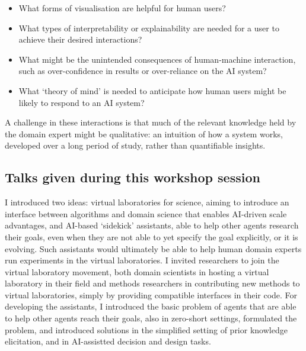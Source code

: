 \begin{itemize}
\item
  What forms of visualisation are helpful for human users?
\item
  What types of interpretability or explainability are needed for a user
  to achieve their desired interactions?
\item
  What might be the unintended consequences of human-machine
  interaction, such as over-confidence in results or over-reliance on
  the AI system?
\item
  What `theory of mind' is needed to anticipate how human users might be
  likely to respond to an AI system?
\end{itemize}

A challenge in these interactions is that much of the relevant knowledge
held by the domain expert might be qualitative: an intuition of how a
system works, developed over a long period of study, rather than
quantifiable insights.

\subsection{Talks given during this workshop session}

\license

I introduced two ideas: virtual laboratories for science, aiming to introduce an interface between algorithms and domain science that enables AI-driven scale advantages, and AI-based ‘sidekick’ assistants, able to help other agents research their goals, even when they are not able to yet specify the goal explicitly, or it is evolving. Such assistants would ultimately be able to help human domain experts run experiments in the virtual laboratories. I invited researchers to join the virtual laboratory movement, both domain scientists in hosting a virtual laboratory in their field and methods researchers in contributing new methods to virtual laboratories, simply by providing compatible interfaces in their code. For developing the assistants, I introduced the basic problem of agents that are able to help other agents reach their goals, also in zero-short settings, formulated the problem, and introduced solutions in the simplified setting of prior knowledge elicitation, and in AI-assistted decision and design tasks.

\license

